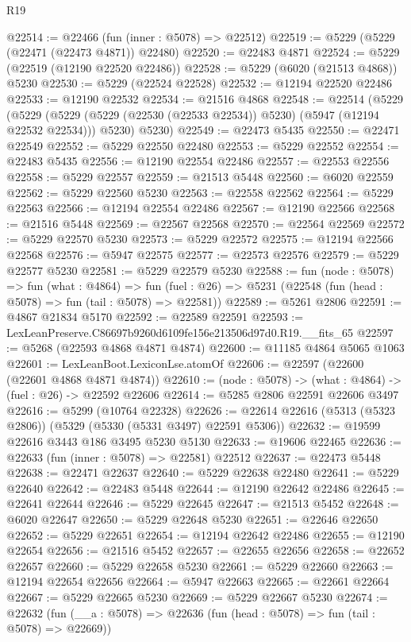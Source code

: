 \begin{lexlean}{R19}
\begin{coremodule}
@22514 := @22466 (fun (inner : @5078) => @22512)
@22519 := @5229 (@5229 (@22471 (@22473 @4871)) @22480)
@22520 := @22483 @4871
@22524 := @5229 (@22519 (@12190 @22520 @22486))
@22528 := @5229 (@6020 (@21513 @4868)) @5230
@22530 := @5229 (@22524 @22528)
@22532 := @12194 @22520 @22486
@22533 := @12190 @22532
@22534 := @21516 @4868
@22548 := @22514
    (@5229
      (@5229 (@5229 (@5229 (@22530 (@22533 @22534)) @5230) (@5947 (@12194 @22532 @22534))) @5230)
      @5230)
@22549 := @22473 @5435
@22550 := @22471 @22549
@22552 := @5229 @22550 @22480
@22553 := @5229 @22552
@22554 := @22483 @5435
@22556 := @12190 @22554 @22486
@22557 := @22553 @22556
@22558 := @5229 @22557
@22559 := @21513 @5448
@22560 := @6020 @22559
@22562 := @5229 @22560 @5230
@22563 := @22558 @22562
@22564 := @5229 @22563
@22566 := @12194 @22554 @22486
@22567 := @12190 @22566
@22568 := @21516 @5448
@22569 := @22567 @22568
@22570 := @22564 @22569
@22572 := @5229 @22570 @5230
@22573 := @5229 @22572
@22575 := @12194 @22566 @22568
@22576 := @5947 @22575
@22577 := @22573 @22576
@22579 := @5229 @22577 @5230
@22581 := @5229 @22579 @5230
@22588 := fun (node : @5078) =>
  fun (what : @4864) =>
  fun (fuel : @26) => @5231 (@22548 (fun (head : @5078) => fun (tail : @5078) => @22581))
@22589 := @5261 @2806
@22591 := @4867 @21834 @5170
@22592 := @22589 @22591
@22593 := LexLeanPreserve.C86697b9260d6109fe156e213506d97d0.R19.__fits_65
@22597 := @5268 (@22593 @4868 @4871 @4874)
@22600 := @11185 @4864 @5065 @1063
@22601 := LexLeanBoot.LexiconLse.atomOf
@22606 := @22597 (@22600 (@22601 @4868 @4871 @4874))
@22610 := (node : @5078) -> (what : @4864) -> (fuel : @26) -> @22592 @22606
@22614 := @5285 @2806 @22591 @22606 @3497
@22616 := @5299 (@10764 @22328)
@22626 := @22614 @22616 (@5313 (@5323 @2806)) (@5329 (@5330 (@5331 @3497) @22591 @5306))
@22632 := @19599 @22616 @3443 @186 @3495 @5230 @5130
@22633 := @19606 @22465
@22636 := @22633 (fun (inner : @5078) => @22581) @22512
@22637 := @22473 @5448
@22638 := @22471 @22637
@22640 := @5229 @22638 @22480
@22641 := @5229 @22640
@22642 := @22483 @5448
@22644 := @12190 @22642 @22486
@22645 := @22641 @22644
@22646 := @5229 @22645
@22647 := @21513 @5452
@22648 := @6020 @22647
@22650 := @5229 @22648 @5230
@22651 := @22646 @22650
@22652 := @5229 @22651
@22654 := @12194 @22642 @22486
@22655 := @12190 @22654
@22656 := @21516 @5452
@22657 := @22655 @22656
@22658 := @22652 @22657
@22660 := @5229 @22658 @5230
@22661 := @5229 @22660
@22663 := @12194 @22654 @22656
@22664 := @5947 @22663
@22665 := @22661 @22664
@22667 := @5229 @22665 @5230
@22669 := @5229 @22667 @5230
@22674 := @22632 (fun (__a : @5078) => @22636 (fun (head : @5078) => fun (tail : @5078) => @22669))

\end{coremodule}
\end{lexlean}
